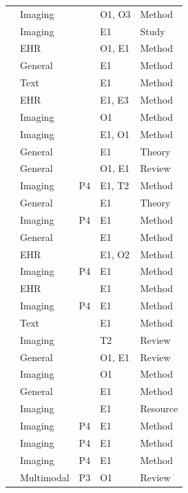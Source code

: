 {\begin{longtable}{@{}p{5.6cm}llll@{}}
\citet{prabhu2019few} & Imaging &  & O1, O3 & Method\\
\citet{raghu2019transfusion} & Imaging &  & E1 & Study\\
\citet{zhang2019metapred} & EHR &  & O1, E1 & Method\\
\citet{brown2020language} & General &  & E1 & Method\\
\citet{lee2020biobert} & Text &  & E1 & Method\\
\citet{li2020behrt} & EHR &  & E1, E3 & Method\\
\citet{mahajan2020meta} & Imaging &  & O1 & Method\\
\citet{roy2020squeeze} & Imaging &  & E1, O1 & Method\\
\citet{tripuraneni2020theory} & General &  & E1 & Theory\\
\citet{wang2020generalizing} & General &  & O1, E1 & Review\\
\citet{azizi2021big} & Imaging & P4 & E1, T2 & Method\\
\citet{du2021few} & General &  & E1 & Theory\\
\citet{huang2021gloria} & Imaging & P4 & E1 & Method\\
\citet{radford2021learning} & General &  & E1 & Method\\
\citet{rasmy2021med} & EHR &  & E1, O2 & Method\\
\citet{sowrirajan2021moco} & Imaging & P4 & E1 & Method\\
\citet{steinberg2021language} & EHR &  & E1 & Method\\
\citet{zhou2021models} & Imaging & P4 & E1 & Method\\
\citet{agrawal2022large} & Text &  & E1 & Method\\
\citet{guan2022domain} & Imaging &  & T2 & Review\\
\citet{hospedales2022meta} & General &  & O1, E1 & Review\\
\citet{hsieh2022gestaltmatcher} & Imaging &  & O1 & Method\\
\citet{hu2022lora} & General &  & E1 & Method\\
\citet{mei2022radimagenet} & Imaging &  & E1 & Resource\\
\citet{tiu2022expert} & Imaging & P4 & E1 & Method\\
\citet{wang2022medclip} & Imaging & P4 & E1 & Method\\
\citet{zhang2022contrastive} & Imaging & P4 & E1 & Method\\
\citet{banerjee2023machine} & Multimodal & P3 & O1 & Review\\

\end{longtable}}
